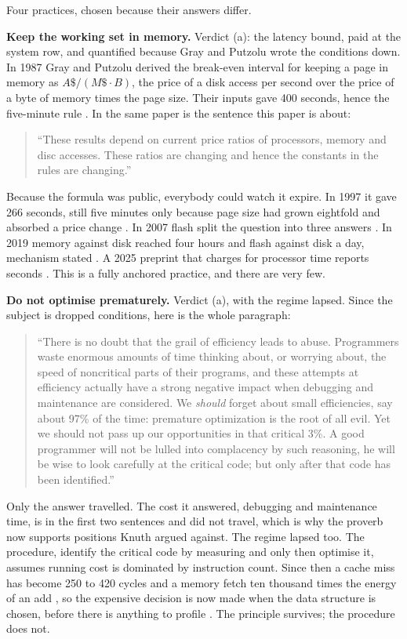 \documentclass[11pt,oneside]{article}
\theoremstyle{definition}
\theoremstyle{remark}
\newcommand{\qt}[1]{\begin{quote}\small #1\end{quote}}
\begin{document}
Four practices, chosen because their answers differ.

\textbf{Keep the working set in memory.} Verdict (a): the latency bound, paid at the system
row, and quantified because Gray and Putzolu wrote the conditions down. In 1987
Gray and Putzolu derived the break-even interval for keeping a page in memory as
$A\$/(M\$\cdot B)$, the price of a disk access per second over the price of a byte of
memory times the page size. Their inputs gave 400 seconds, hence the five-minute rule
\cite{gray1987}. In the same paper is the sentence this paper is about:

\qt{``These results depend on current price ratios of processors, memory and disc accesses.
These ratios are changing and hence the constants in the rules are changing.''
\cite{gray1987}}

Because the formula was public, everybody could watch it expire. In 1997 it gave 266
seconds, still five minutes only because page size had grown eightfold and absorbed a price
change \cite{graygraefe1997}. In 2007 flash split the question into three answers
\cite{graefe2007}. In 2019 memory against disk reached four hours and flash against disk a
day, mechanism stated \cite{appuswamy2019}. A 2025 preprint that charges for processor
time reports seconds \cite{zhang2025}.  This is a fully anchored practice, and there are very few.

\textbf{Do not optimise prematurely.}\label{sec:knuth} Verdict (a), with the regime lapsed.
Since the subject is dropped conditions, here is the whole paragraph:

\qt{``There is no doubt that the grail of efficiency leads to abuse. Programmers waste
enormous amounts of time thinking about, or worrying about, the speed of noncritical parts
of their programs, and these attempts at efficiency actually have a strong negative impact
when debugging and maintenance are considered. We \emph{should} forget about small
efficiencies, say about 97\% of the time: premature optimization is the root of all evil. Yet
we should not pass up our opportunities in that critical 3\%. A good programmer will not be
lulled into complacency by such reasoning, he will be wise to look carefully at the critical
code; but only after that code has been identified.'' \cite{knuth1974}}

Only the answer travelled. The cost it answered, debugging and maintenance time, is in the
first two sentences and did not travel, which is why the proverb now supports positions
Knuth argued against. The regime lapsed too. The procedure, identify the critical code by
measuring and only then optimise it, assumes running cost is dominated by instruction
count. Since then a cache miss has become 250 to 420 cycles
\cite{sevencpu,chipsandcheese} and a memory fetch ten thousand times the energy of an add
\cite{dally2022}, so the expensive decision is now made when the data structure is chosen,
before there is anything to profile \cite{acton2014}. The principle survives; the procedure
does not.
\end{document}
